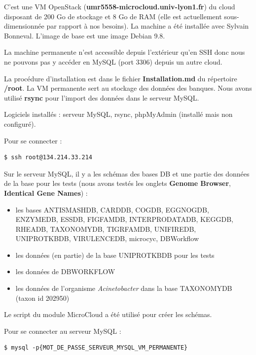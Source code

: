 C'est une VM OpenStack (\textbf{umr5558-microcloud.univ-lyon1.fr}) du cloud  disposant de 200 Go de stockage et 8 Go de RAM (elle est actuellement sous-dimensionnée par rapport à nos besoins). La machine a été installée avec Sylvain Bonneval. L'image de base est une image Debian 9.8.

La machine permanente n'est accessible depuis l'extérieur qu'en SSH donc nous ne pouvons pas y accéder en MySQL (port 3306) depuis un autre cloud.
\newline

La procédure d'installation est dans le fichier \textbf{Installation.md} du répertoire \textbf{/root}. La VM permanente sert au stockage des données des banques. Nous avons utilisé \textbf{rsync} pour l'import des données dans le serveur MySQL.
\newline

Logiciels installés : serveur MySQL, rsync, phpMyAdmin (installé mais non configuré). 
\newline

Pour se connecter : 
\begin{lstlisting}[style=bash]
$ ssh root@134.214.33.214
\end{lstlisting}
\bigskip

Sur le serveur MySQL, il y a les schémas des bases DB et une partie des données de la base pour les tests (nous avons testés les onglets \textbf{Genome Browser}, \textbf{Identical Gene Names}) :
\begin{itemize}
	\item les bases ANTISMASHDB, CARDDB, COGDB, EGGNOGDB, ENZYMEDB, ESSDB, FIGFAMDB, INTERPRODATADB, KEGGDB, RHEADB, TAXONOMYDB, TIGRFAMDB, UNIFIREDB, UNIPROTKBDB, VIRULENCEDB, microcyc, DBWorkflow
	\item les données (en partie) de la base UNIPROTKBDB pour les tests
	\item les données de DBWORKFLOW
	\item les données de l'organisme \textit{Acinetobacter} dans la base TAXONOMYDB (taxon id 202950)
\end{itemize}

Le script  du module MicroCloud a été utilisé pour créer les schémas.
\newline

Pour se connecter au serveur MySQL :
\begin{lstlisting}[style=bash]
$ mysql -p{MOT_DE_PASSE_SERVEUR_MYSQL_VM_PERMANENTE}
\end{lstlisting}

